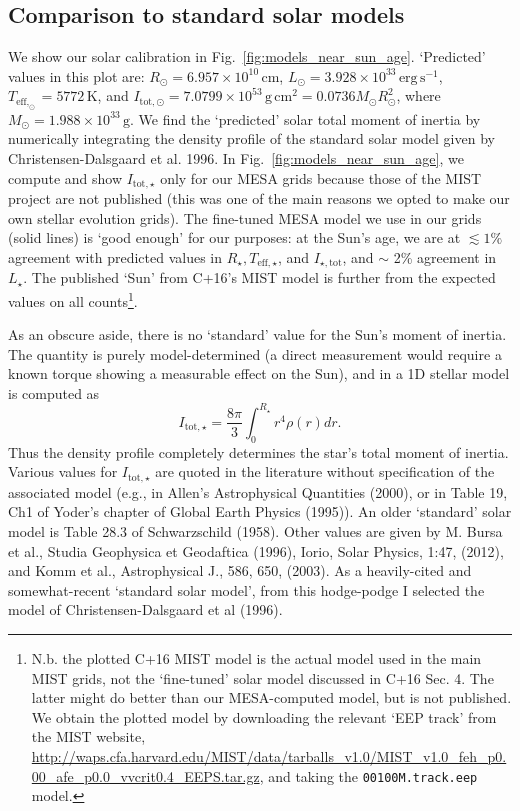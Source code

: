 \documentclass{article}
\begin{document}
\subsection{Comparison to standard solar models}
\label{sec:solar_calibration}
We show our solar calibration in Fig.~\ref{fig:models_near_sun_age}.
`Predicted' values in this plot are: $R_\odot = 
6.957\times10^{10}\,\mathrm{cm}$, $L_\odot = 
3.928\times10^{33}\,\mathrm{erg\,s^{-1}}$, $T_\mathrm{eff,_\odot} = 
5772\,\mathrm{K}$, and $I_\mathrm{tot,\odot} = 
7.0799\times10^{53}\,\mathrm{g\,cm^2} = 
0.0736 M_\odot R_\odot^2$, where $M_\odot = 1.988\times10^{33}\,\mathrm{g}$.
We find the `predicted' solar total moment of inertia by numerically 
integrating the density profile of the standard solar model given by 
Christensen-Dalsgaard et al. 1996.
In Fig.~\ref{fig:models_near_sun_age}, we compute and show 
$I_\mathrm{tot,\star}$ only for our MESA grids because those of the MIST 
project are not published (this was one of the main reasons we opted to make 
our own stellar evolution grids).
The fine-tuned MESA model we use in our grids (solid lines) is `good enough' 
for our purposes: at the Sun's age, we are at $\lesssim 1\%$ agreement with 
predicted values in $R_\star, T_\mathrm{eff,\star}$, and 
$I_\mathrm{\star,tot}$, and $\sim$ 2\% agreement in $L_\star$.
The published `Sun' from C+16's MIST model is further from the expected values 
on all counts\footnote{N.b. the plotted C+16 MIST model is the actual model 
used in the main MIST grids, not the `fine-tuned' solar model discussed in C+16 
Sec. 4. The latter might do better than our MESA-computed model, but is not 
published. We obtain the plotted model by downloading the relevant `EEP track' 
from the 
MIST website, 
\url{http://waps.cfa.harvard.edu/MIST/data/tarballs_v1.0/MIST_v1.0_feh_p0.00_afe_p0.0_vvcrit0.4_EEPS.tar.gz},
and taking the \texttt{00100M.track.eep} model.}.

As an obscure aside, there is no `standard' value for the Sun's moment of 
inertia. The quantity is purely model-determined (a direct measurement would 
require a known torque showing a measurable effect on the Sun), and in a 1D 
stellar model is computed as 
\begin{equation}
I_{\mathrm{tot,\star}} = \frac{8\pi}{3} \int_0^{R_\star} r^4 \rho(r) dr.
\end{equation}
Thus the density profile completely determines the star's total moment of 
inertia. Various values for $I_\mathrm{tot,\star}$ are quoted in the 
literature without specification of the associated model (e.g., in Allen's 
Astrophysical Quantities (2000), or in Table 19, Ch1 of Yoder's chapter of 
Global Earth Physics (1995)). An older `standard' solar model is Table 28.3 of 
Schwarzschild (1958). Other values are given by M. Bursa et al., Studia 
Geophysica et Geodaftica (1996), Iorio, Solar Physics, 1:47, (2012), and Komm 
et al., Astrophysical J., 586, 650, (2003).
As a heavily-cited and somewhat-recent `standard solar model', from this 
hodge-podge I selected the model of Christensen-Dalsgaard et al (1996). 
\end{document}
